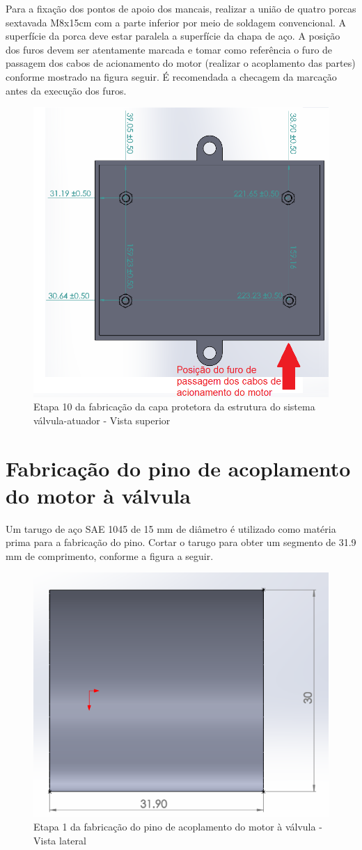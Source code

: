 Para a fixação dos pontos de apoio dos mancais, realizar a união de quatro porcas sextavada M8x15cm com a parte inferior por meio de soldagem convencional. A superfície da porca deve estar paralela a superfície da chapa de aço. A posição dos furos devem ser atentamente marcada e tomar como referência o furo de passagem dos cabos de acionamento do motor (realizar o acoplamento das partes) conforme mostrado na figura seguir. É recomendada a checagem da marcação antes da execução dos furos.

\begin{figure} [H]
    \centering
    \includegraphics[width=.6\textwidth]{Figuras/montagemAbastecimento/capa/etapa10.png}
    \caption{Etapa 10 da fabricação da capa protetora da estrutura do sistema válvula-atuador - Vista superior}
    \label{fig:etapa10}
\end{figure}
 
\section{Fabricação do pino de acoplamento do motor à válvula}
Um tarugo de aço SAE 1045 de 15 mm de diâmetro é utilizado como matéria prima para a fabricação do pino. Cortar o tarugo para obter um segmento de 31.9 mm de comprimento, conforme a figura a seguir. 

\begin{figure} [H]
    \centering
    \includegraphics[width=.4\textwidth]{Figuras/montagemAbastecimento/pino/etapa1.png}
    \caption{Etapa 1 da fabricação do pino de acoplamento do motor à válvula - Vista lateral}
    \label{fig:pinoetapa1}
\end{figure}

